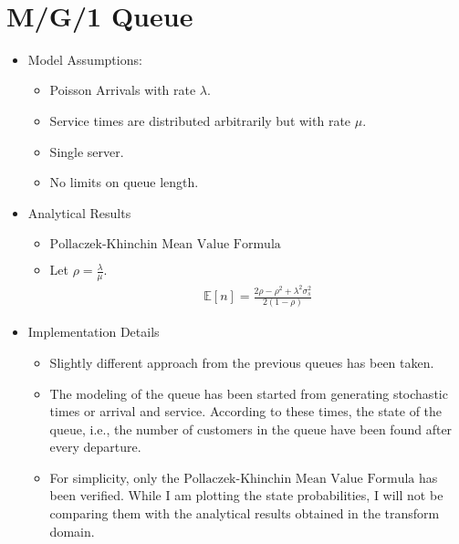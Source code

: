 \documentclass[11pt]{article}
\providecommand{\tightlist}{%
      \setlength{\itemsep}{0pt}\setlength{\parskip}{0pt}}
\begin{document}
    \begin{center}
    \end{center}
    { \hspace*{\fill} \\}
    
    \newpage
    \section{M/G/1 Queue}

\begin{itemize}
\tightlist
\item
  Model Assumptions:

  \begin{itemize}
  \tightlist
  \item
    Poisson Arrivals with rate \(\lambda\).
  \item
    Service times are distributed arbitrarily but with rate \(\mu\).
  \item
    Single server.
  \item
    No limits on queue length.
  \end{itemize}
\item
  Analytical Results

  \begin{itemize}
  \tightlist
  \item
    \(\text{Pollaczek-Khinchin Mean Value Formula}\)
  \item
    Let \(\rho = \frac{\lambda}{\mu}\). 
    \begin{align}
      \mathbb{E}[n] = \frac{2\rho - \rho^2 + \lambda^2 \sigma_s^2}{2 (1 - \rho)}
      \end{align}
  \end{itemize}
\item
  Implementation Details

  \begin{itemize}
  \tightlist
  \item
    Slightly different approach from the previous queues has been taken.
  \item
    The modeling of the queue has been started from generating
    stochastic times or arrival and service. According to these times,
    the state of the queue, i.e., the number of customers in the queue
    have been found after every departure.
  \item
    For simplicity, only the
    \(\text{Pollaczek-Khinchin Mean Value Formula}\) has been verified.
    While I am plotting the state probabilities, I will not be comparing
    them with the analytical results obtained in the transform domain.
  \end{itemize}
\end{itemize}
\end{document}
